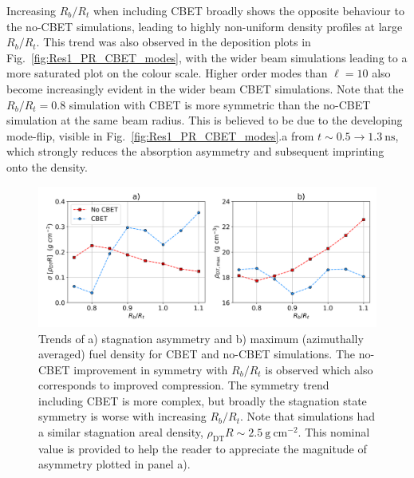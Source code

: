 Increasing $R_b/R_t$ when including \ac{CBET} broadly shows the opposite behaviour to the no-\ac{CBET} simulations, leading to highly non-uniform density profiles at large $R_b/R_t$.
This trend was also observed in the deposition plots in Fig.~\ref{fig:Res1_PR_CBET_modes}, with the wider beam simulations leading to a more saturated plot on the colour scale.
Higher order modes than $\ell=10$ also become increasingly evident in the wider beam \ac{CBET} simulations.
Note that the $R_b/R_t=0.8$ simulation with \ac{CBET} is more symmetric than the no-\ac{CBET} simulation at the same beam radius.
This is believed to be due to the developing mode-flip, visible in Fig.~\ref{fig:Res1_PR_CBET_modes}.a from $t\sim 0.5\rightarrow 1.3\ \text{ns}$, which strongly reduces the absorption asymmetry and subsequent imprinting onto the density.

\begin{figure}[t!]
    \includegraphics[width=1.0\linewidth]{Results1/Images/RbRt_sig_rhomax.png}
    \centering
    \caption{Trends of a) stagnation asymmetry and b) maximum (azimuthally averaged) fuel density for \ac{CBET} and no-\ac{CBET} simulations.
    The no-\ac{CBET} improvement in symmetry with $R_b/R_t$ is observed which also corresponds to improved compression.
    The symmetry trend including \ac{CBET} is more complex, but broadly the stagnation state symmetry is worse with increasing $R_b/R_t$.
    Note that simulations had a similar stagnation areal density, $\rho_{\text{DT}} R\sim 2.5\ \text{g}\ \text{cm}^{-2}$.
    This nominal value is provided to help the reader to appreciate the magnitude of asymmetry plotted in panel a).}%
    \label{fig:Res1_asymm_trend}
\end{figure}

